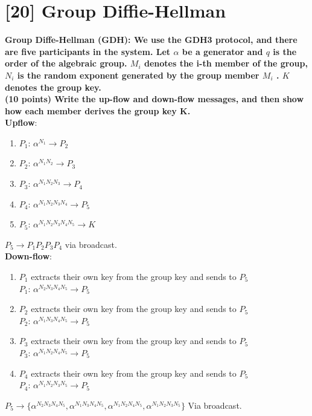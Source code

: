 \documentclass[letterpaper,11pt,notitlepage,fleqn]{article}
\begin{document}
\section{[20] Group Diffie-Hellman}
\noindent\textbf{Group Diffe-Hellman (GDH): We use the GDH3 protocol, and there are ﬁve participants in the system. Let $\alpha$ be a generator and $q$ is the order of the algebraic group. $M_{i}$ denotes the i-th member of the group, $N_{i}$ is the random exponent generated by the group member $M_{i}$ . $K$ denotes the group key.} \\
\noindent\textbf{(10 points) Write the up-ﬂow and down-ﬂow messages, and then show how each member derives the group key K.} \\
\textbf{Upflow}: \\
\begin{enumerate}
    \item $P_{1}$: $\alpha^{N_{1}} \rightarrow P_{2}$ 
    \item $P_{2}$: $\alpha^{N_{1}N_{2}} \rightarrow P_{3}$ 
    \item $P_{3}$: $\alpha^{N_{1}N_{2}N_{3}} \rightarrow P_{4}$ 
    \item $P_{4}$: $\alpha^{N_{1}N_{2}N_{3}N_{4}} \rightarrow P_{5}$ 
    \item $P_{5}$: $\alpha^{N_{1}N_{2}N_{3}N_{4}N_{5}} \rightarrow K$
\end{enumerate}
$P_{5} \rightarrow P_{1}P_{2}P_{3}P_{4}$ via broadcast.\\
\textbf{Down-flow}:
\begin{enumerate}
    \item $P_1$ extracts their own key from the group key and sends to $P_{5}$ \\
        $P_{1}$: $\alpha^{N_{2}N_{3}N_{4}N_{5}} \rightarrow P_{5}$ 
    \item $P_2$ extracts their own key from the group key and sends to $P_{5}$ \\
        $P_{2}$: $\alpha^{N_{1}N_{3}N_{4}N_{5}} \rightarrow P_{5}$ 
    \item $P_3$ extracts their own key from the group key and sends to $P_{5}$ \\
        $P_{3}$: $\alpha^{N_{1}N_{2}N_{4}N_{5}} \rightarrow P_{5}$ 
    \item $P_4$ extracts their own key from the group key and sends to $P_{5}$ \\
        $P_{4}$: $\alpha^{N_{1}N_{2}N_{3}N_{5}} \rightarrow P_{5}$ 
\end{enumerate}
$P_{5} \rightarrow \{\alpha^{N_{2}N_{3}N_{4}N_{5}}, \alpha^{N_{1}N_{3}N_{4}N_{5}},\alpha^{N_{1}N_{2}N_{4}N_{5}}, \alpha^{N_{1}N_{2}N_{3}N_{5}}\}$ Via broadcast.\\
\end{document}
